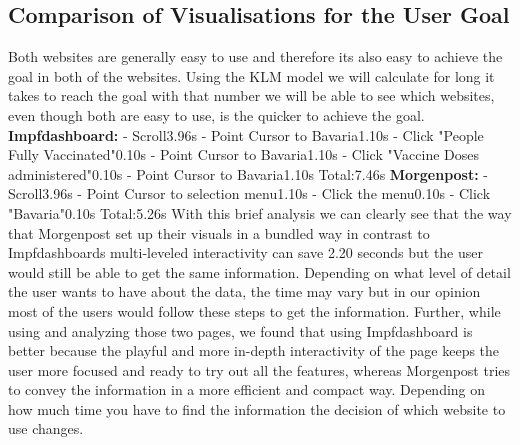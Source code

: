 \documentclass[12pt, letterpaper]{article}
\begin{document}
\subsection{Comparison of Visualisations for the User Goal}
Both websites are generally easy to use and therefore its also easy to achieve the goal in both of the websites. Using the KLM model we will calculate for long it takes to reach the goal with that number we will be able to see which websites, even though both are easy to use, is the quicker to achieve the goal.\newline
\newline
\textbf{Impfdashboard: }\newline
- Scroll\tab3.96s\newline
- Point Cursor to Bavaria\tab1.10s\newline
- Click "People Fully Vaccinated"\tab0.10s\newline
- Point Cursor to Bavaria\tab1.10s\newline
- Click "Vaccine Doses administered"\tab0.10s\newline
- Point Cursor to Bavaria\tab1.10s\newline
Total:\tab7.46s
\newline
\newline
\textbf{Morgenpost: }\newline
- Scroll\tab3.96s\newline
- Point Cursor to selection menu\tab1.10s\newline
- Click the menu\tab0.10s\newline
- Click "Bavaria"\tab0.10s\newline
Total:\tab5.26s
\newline
\newline
With this brief analysis we can clearly see that the way that Morgenpost set up their visuals in a bundled way in contrast to Impfdashboards multi-leveled interactivity can save 2.20 seconds but the user would still be able to get the same information. Depending on what level of detail the user wants to have about the data, the time may vary but in our opinion most of the users would follow these steps to get the information.\newline
Further, while using and analyzing those two pages, we found that using Impfdashboard is better because the playful and more in-depth interactivity of the page keeps the user more focused and ready to try out all the features, whereas Morgenpost tries to convey the information in a more efficient and compact way. Depending on how much time you have to find the information the decision of which website to use changes.
\end{document}
